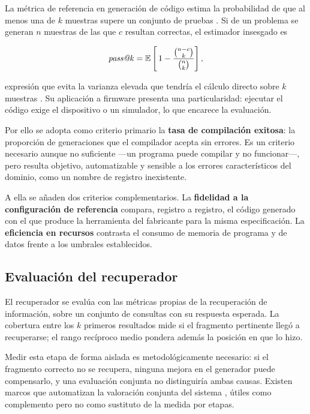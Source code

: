 La métrica de referencia en generación de código estima la probabilidad de que
al menos una de $k$ muestras supere un conjunto de pruebas \cite{chen2021codex}.
Si de un problema se generan $n$ muestras de las que $c$ resultan correctas, el
estimador insesgado es

\begin{equation}
  \text{\emph{pass@k}} = \mathbb{E}\left[\,
    1 - \frac{\binom{n-c}{k}}{\binom{n}{k}} \right] ,
  \label{eq:passk}
\end{equation}

expresión que evita la varianza elevada que tendría el cálculo directo sobre $k$
muestras \cite{chen2021codex}.
Su aplicación a firmware presenta una particularidad: ejecutar el código exige
el dispositivo o un simulador, lo que encarece la evaluación.

Por ello se adopta como criterio primario la \textbf{tasa de compilación
exitosa}: la proporción de generaciones que el compilador acepta sin errores.
Es un criterio necesario aunque no suficiente —un programa puede compilar y no
funcionar—, pero resulta objetivo, automatizable y sensible a los errores
característicos del dominio, como un nombre de registro inexistente.

A ella se añaden dos criterios complementarios. La \textbf{fidelidad a la
configuración de referencia} compara, registro a registro, el código generado
con el que produce la herramienta del fabricante para la misma especificación.
La \textbf{eficiencia en recursos} contrasta el consumo de memoria de programa y
de datos frente a los umbrales establecidos.

\subsection{Evaluación del recuperador}

El recuperador se evalúa con las métricas propias de la recuperación de
información, sobre un conjunto de consultas con su respuesta esperada. La
cobertura entre los $k$ primeros resultados mide si el fragmento pertinente
llegó a recuperarse; el rango recíproco medio pondera además la posición en que
lo hizo.

Medir esta etapa de forma aislada es metodológicamente necesario: si el
fragmento correcto no se recupera, ninguna mejora en el generador puede
compensarlo, y una evaluación conjunta no distinguiría ambas causas. Existen
marcos que automatizan la valoración conjunta del sistema
\cite{es2024ragas}, útiles como complemento pero no como sustituto de la medida
por etapas.

